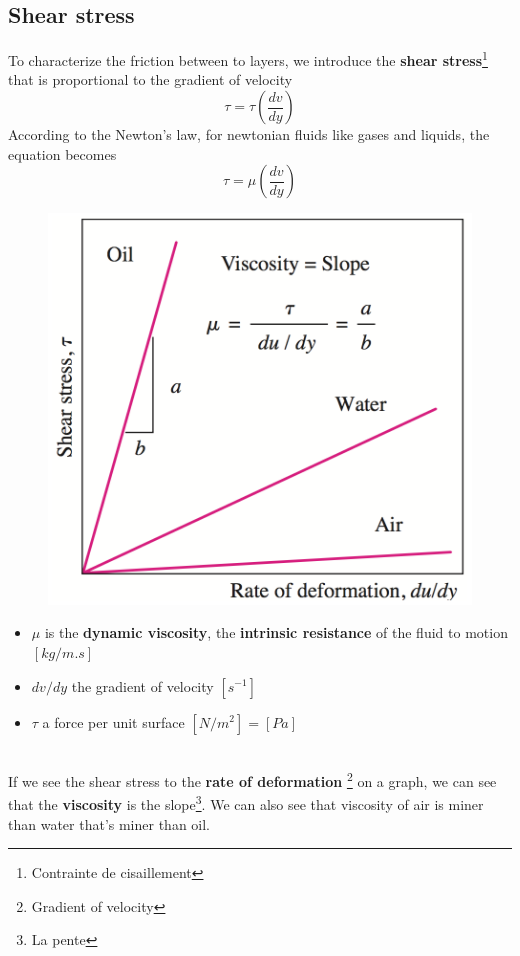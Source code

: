 \subsection{Shear stress}
To characterize the friction between to layers, we introduce the \textbf{shear stress}\footnote{Contrainte de cisaillement} that is proportional to the gradient of velocity
\begin{equation}
	\tau = \tau \left( \frac{dv}{dy} \right)
\end{equation}
According to the Newton's law, for newtonian fluids like gases and liquids, the equation becomes
\begin{equation}
	\tau = \mu \left( \frac{dv}{dy} \right)
\end{equation}
\begin{figure}
	\includegraphics[scale=0.26]{ch1/5}
\end{figure}
\begin{itemize}
	\item $\mu$ is the \textbf{dynamic viscosity}, the \textbf{intrinsic resistance} of the fluid to motion $[kg/m.s]$
	\item $dv/dy$ the gradient of velocity $[s^{-1}]$
	\item $\tau$ a force per unit surface $[N/m^2] = [Pa]$
\end{itemize}
\ \\
If we see the shear stress to the \textbf{rate of deformation} \footnote{Gradient of velocity} on a graph, we can see that the \textbf{viscosity} is the slope\footnote{La pente}. We can also see that viscosity of air is miner than water that's miner than oil. 
	
